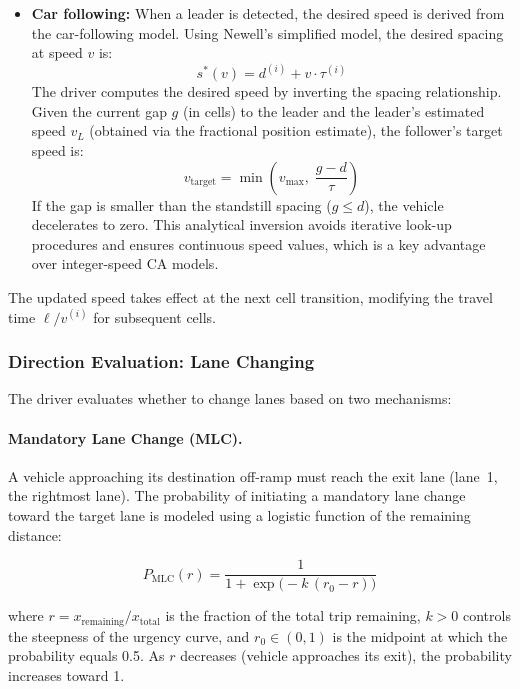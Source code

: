\documentclass[review,authoryear]{elsarticle}
\begin{document}
\begin{itemize}
    \item \textbf{Car following:} When a leader is detected, the desired speed is derived from the car-following model. Using Newell's simplified model, the desired spacing at speed $v$ is:
    \begin{equation}
        s^{*}(v) = d^{(i)} + v \cdot \tau^{(i)}
        \label{eq:desired_spacing}
    \end{equation}
    The driver computes the desired speed by inverting the spacing relationship. Given the current gap $g$ (in cells) to the leader and the leader's estimated speed $v_L$ (obtained via the fractional position estimate), the follower's target speed is:
    \begin{equation}
        v_{\text{target}} = \min\!\left(v_{\max},\; \frac{g - d}{\tau}\right)
        \label{eq:speed_target}
    \end{equation}
    If the gap is smaller than the standstill spacing ($g \leq d$), the vehicle decelerates to zero. This analytical inversion avoids iterative look-up procedures and ensures continuous speed values, which is a key advantage over integer-speed CA models.
\end{itemize}

The updated speed takes effect at the next cell transition, modifying the travel time $\ell / v^{(i)}$ for subsequent cells.

\subsubsection{Direction Evaluation: Lane Changing}
\label{sec:lane_changing}

The driver evaluates whether to change lanes based on two mechanisms:

\paragraph{Mandatory Lane Change (MLC).}
A vehicle approaching its destination off-ramp must reach the exit lane (lane~1, the rightmost lane). The probability of initiating a mandatory lane change toward the target lane is modeled using a logistic function of the remaining distance:

\begin{equation}
    P_{\text{MLC}}(r) = \frac{1}{1 + \exp\!\big(-k\,(r_0 - r)\big)}
    \label{eq:mlc_logistic}
\end{equation}

where $r = x_{\text{remaining}} / x_{\text{total}}$ is the fraction of the total trip remaining, $k > 0$ controls the steepness of the urgency curve, and $r_0 \in (0, 1)$ is the midpoint at which the probability equals 0.5. As $r$ decreases (vehicle approaches its exit), the probability increases toward 1.
\end{document}
